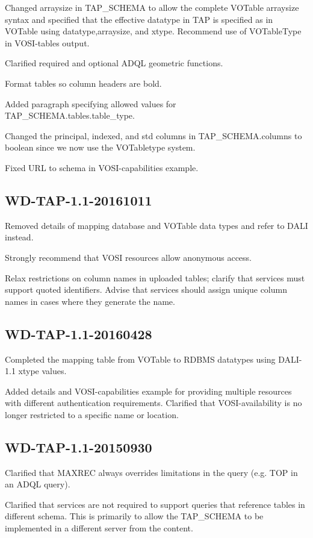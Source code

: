 \documentclass[11pt,letter]{ivoa}
\newcommand{\tapschema}{TAP\_SCHE\-MA}
\newcommand{\tapschema}{\mbox{%
  \relsize{-0.5}TAP\discretionary{-}{}{\kern-2pt\_}SCHEMA}}
\begin{document}
Changed arraysize in \tapschema{} to allow the complete VOTable arraysize syntax and specified that the effective datatype in TAP is specified as in VOTable using datatype,arraysize, and xtype. Recommend use of VOTableType in VOSI-tables output.

Clarified required and optional ADQL geometric functions.

Format tables so column headers are bold.

Added paragraph specifying allowed values for \tapschema.tables.table\_type.

Changed the principal, indexed, and std columns in \tapschema.columns to boolean since we
now use the VOTabletype system.

Fixed URL to schema in VOSI-capabilities example.

\subsection{WD-TAP-1.1-20161011}

Removed details of mapping database and VOTable data types and refer to DALI 
instead. 

Strongly recommend that VOSI resources allow anonymous access.

Relax restrictions on column names in uploaded tables; clarify that services 
must support quoted identifiers. Advise that services should assign unique 
column names in cases where they generate the name.

\subsection{WD-TAP-1.1-20160428}

Completed the mapping table from VOTable to RDBMS datatypes using DALI-1.1 xtype values.

Added details and VOSI-capabilities example for providing multiple resources with different 
authentication requirements. Clarified that VOSI-availability is no longer restricted to a
specific name or location.

\subsection{WD-TAP-1.1-20150930}

Clarified that MAXREC always overrides limitations in the query (e.g. 
TOP in an ADQL query).

Clarified that services are not required to support queries that reference tables 
in different schema. This is primarily to allow the \tapschema{} to be implemented 
in a different server from the content.
\end{document}

